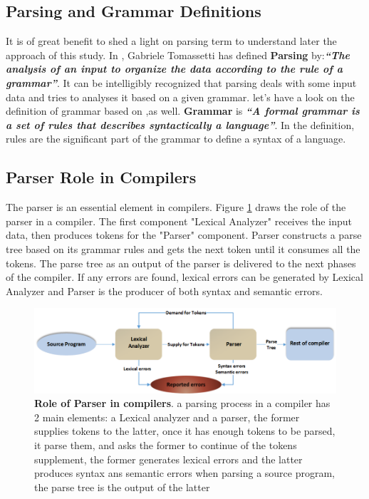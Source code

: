\subsection{Parsing and Grammar Definitions}
It is of great benefit to shed a light on parsing term to understand later the approach of this study. In \cite{parsingGuide2017}, Gabriele Tomassetti has defined \textbf{Parsing} by:{\it  \textbf{``The analysis of an input to organize the data according to the rule of a grammar''}}. It can be intelligibly recognized that parsing deals with some input data and tries to analyses it based on a given grammar. let's have a look on the definition of grammar based on  \cite{parsingGuide2017},as well. \textbf{Grammar} is 
{\it \textbf{``A formal grammar is a set of rules that describes syntactically a language''}}. In the definition, rules are the significant part of the grammar to define a syntax of a language.  
\subsection{Parser Role in Compilers}
The parser is an essential element in  compilers. {Figure \ref{Fig:parserPosition}} draws the role of the parser in a compiler. The first component "Lexical Analyzer" receives the input data, then produces tokens for  the "Parser" component. Parser constructs a parse tree based on its grammar rules and gets the next token until it consumes all the tokens. The parse tree as an output of the parser is delivered to the next phases of the compiler. If any errors are found, lexical errors can be generated by Lexical Analyzer and Parser is the producer of both syntax and semantic errors. 

\begin{figure}[ht]
	\begin{center}	\setlength\belowcaptionskip{-5mm}
	\includegraphics[scale=0.55,angle=0]{images/ParserRole}
	\caption{\textbf{Role of Parser in compilers}. a parsing process in a compiler has 2 main elements: a Lexical analyzer and a parser, the former supplies tokens to the latter, once it has enough tokens to be parsed, it parse them, and asks the former to continue of the tokens supplement, the former generates lexical errors and the latter produces syntax ans semantic errors when parsing a source program, the parse tree is the output of the latter }
		\label{Fig:parserPosition}
	\end{center}
\end{figure}
